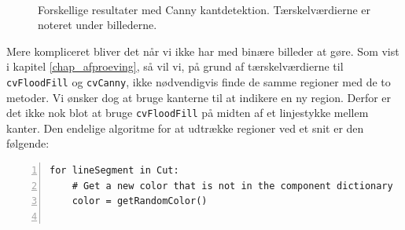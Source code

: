 {\begin{figure}[!p]
    \\
    \hspace{1em}
    \caption[]{Forskellige resultater med Canny kantdetektion.
    Tærskelværdierne er noteret under billederne.}
    \label{region_extract}
\end{figure}

Mere kompliceret bliver det når vi ikke har med binære billeder at gøre.
Som vist i kapitel \ref{chap_afproeving}, så vil vi, på grund af
tærskelværdierne til \texttt{cvFloodFill} og \texttt{cvCanny}, ikke
nødvendigvis finde de samme regioner med de to metoder. Vi ønsker dog at
bruge kanterne til at indikere en ny region. Derfor er det ikke nok blot
at bruge \texttt{cvFloodFill} på midten af et linjestykke mellem kanter.
Den endelige algoritme for at udtrække regioner ved et snit er den
følgende:

\vspace{0.5cm}
\begin{lstlisting}[caption={Metoder til rekonstruktion af
    kørsler},captionpos=b,label={rekonst_koersel},numbers=left]
for lineSegment in Cut:
    # Get a new color that is not in the component dictionary
    color = getRandomColor()


\end{lstlisting}}
